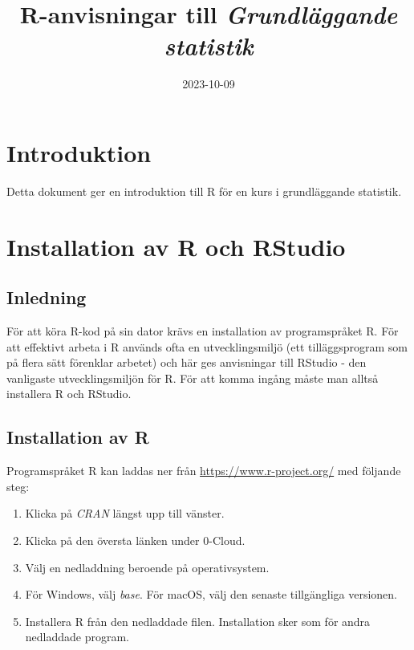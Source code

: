 \documentclass[
]{book}
\title{R-anvisningar till \emph{Grundläggande statistik}}
\author{}
\date{\vspace{-2.5em}2023-10-09}
\providecommand{\tightlist}{%
  \setlength{\itemsep}{0pt}\setlength{\parskip}{0pt}}
\theoremstyle{definition}
\theoremstyle{definition}
\theoremstyle{definition}
\theoremstyle{definition}
\theoremstyle{remark}
\begin{document}
\maketitle

{
\setcounter{tocdepth}{1}
\tableofcontents
}
\hypertarget{introduktion}{%
\chapter*{Introduktion}\label{introduktion}}

Detta dokument ger en introduktion till R för en kurs i grundläggande statistik.

\hypertarget{installation-av-r-och-rstudio}{%
\chapter*{Installation av R och RStudio}\label{installation-av-r-och-rstudio}}

\hypertarget{inledning}{%
\section{Inledning}\label{inledning}}

För att köra R-kod på sin dator krävs en installation av programspråket R. För att effektivt arbeta i R används ofta en utvecklingsmiljö (ett tilläggsprogram som på flera sätt förenklar arbetet) och här ges anvisningar till RStudio - den vanligaste utvecklingsmiljön för R. För att komma ingång måste man alltså installera R och RStudio.

\hypertarget{installation-av-r}{%
\section{Installation av R}\label{installation-av-r}}

Programspråket R kan laddas ner från \url{https://www.r-project.org/} med följande steg:

\begin{enumerate}
\def\labelenumi{\arabic{enumi}.}
\tightlist
\item
  Klicka på \emph{CRAN} längst upp till vänster.
\item
  Klicka på den översta länken under 0-Cloud.
\item
  Välj en nedladdning beroende på operativsystem.
\item
  För Windows, välj \emph{base}. För macOS, välj den senaste tillgängliga versionen.
\item
  Installera R från den nedladdade filen. Installation sker som för andra nedladdade program.
\end{enumerate}
\end{document}
